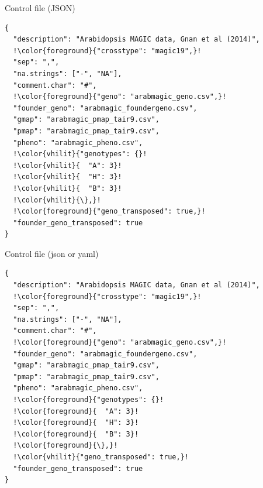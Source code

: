 \documentclass[12pt,t,aspectratio=1610]{beamer}
\begin{document}
\begin{frame}[c,fragile]{Control file (JSON)}
\addtocounter{framenumber}{-1}
\begin{semiverbatim} \begin{lstlisting}[escapechar=!]
{
  "description": "Arabidopsis MAGIC data, Gnan et al (2014)",
  !\color{foreground}{"crosstype": "magic19",}!
  "sep": ",",
  "na.strings": ["-", "NA"],
  "comment.char": "#",
  !\color{foreground}{"geno": "arabmagic_geno.csv",}!
  "founder_geno": "arabmagic_foundergeno.csv",
  "gmap": "arabmagic_pmap_tair9.csv",
  "pmap": "arabmagic_pmap_tair9.csv",
  "pheno": "arabmagic_pheno.csv",
  !\color{vhilit}{"genotypes": {}!
  !\color{vhilit}{  "A": 3}!
  !\color{vhilit}{  "H": 3}!
  !\color{vhilit}{  "B": 3}!
  !\color{vhilit}{\},}!
  !\color{foreground}{"geno_transposed": true,}!
  "founder_geno_transposed": true
}
\end{lstlisting} \end{semiverbatim}
\end{frame}



\begin{frame}[c,fragile]{Control file (json or yaml)}
\addtocounter{framenumber}{-1}
\begin{semiverbatim} \begin{lstlisting}[escapechar=!]
{
  "description": "Arabidopsis MAGIC data, Gnan et al (2014)",
  !\color{foreground}{"crosstype": "magic19",}!
  "sep": ",",
  "na.strings": ["-", "NA"],
  "comment.char": "#",
  !\color{foreground}{"geno": "arabmagic_geno.csv",}!
  "founder_geno": "arabmagic_foundergeno.csv",
  "gmap": "arabmagic_pmap_tair9.csv",
  "pmap": "arabmagic_pmap_tair9.csv",
  "pheno": "arabmagic_pheno.csv",
  !\color{foreground}{"genotypes": {}!
  !\color{foreground}{  "A": 3}!
  !\color{foreground}{  "H": 3}!
  !\color{foreground}{  "B": 3}!
  !\color{foreground}{\},}!
  !\color{vhilit}{"geno_transposed": true,}!
  "founder_geno_transposed": true
}
\end{lstlisting} \end{semiverbatim}
\end{frame}
\end{document}
